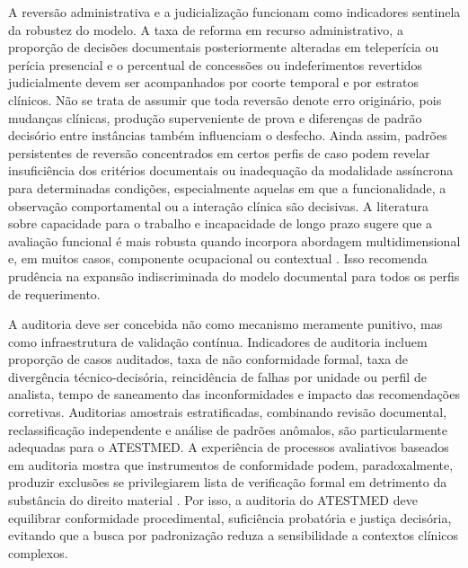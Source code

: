 \documentclass[12pt,a4paper]{article}
\begin{document}
A reversão administrativa e a judicialização funcionam como indicadores sentinela da robustez do modelo. A taxa de reforma em recurso administrativo, a proporção de decisões documentais posteriormente alteradas em teleperícia ou perícia presencial e o percentual de concessões ou indeferimentos revertidos judicialmente devem ser acompanhados por coorte temporal e por estratos clínicos. Não se trata de assumir que toda reversão denote erro originário, pois mudanças clínicas, produção superveniente de prova e diferenças de padrão decisório entre instâncias também influenciam o desfecho. Ainda assim, padrões persistentes de reversão concentrados em certos perfis de caso podem revelar insuficiência dos critérios documentais ou inadequação da modalidade assíncrona para determinadas condições, especialmente aquelas em que a funcionalidade, a observação comportamental ou a interação clínica são decisivas. A literatura sobre capacidade para o trabalho e incapacidade de longo prazo sugere que a avaliação funcional é mais robusta quando incorpora abordagem multidimensional e, em muitos casos, componente ocupacional ou contextual \parencite{gabbay2011niceguidanceonlongtermsicknessandincapacity, przysada2019anassessmentofworkabilityafterthecompletionofre, deveau2011workplaceaccommodationandauditbasedevaluationprocess}. Isso recomenda prudência na expansão indiscriminada do modelo documental para todos os perfis de requerimento.

A auditoria deve ser concebida não como mecanismo meramente punitivo, mas como infraestrutura de validação contínua. Indicadores de auditoria incluem proporção de casos auditados, taxa de não conformidade formal, taxa de divergência técnico-decisória, reincidência de falhas por unidade ou perfil de analista, tempo de saneamento das inconformidades e impacto das recomendações corretivas. Auditorias amostrais estratificadas, combinando revisão documental, reclassificação independente e análise de padrões anômalos, são particularmente adequadas para o ATESTMED. A experiência de processos avaliativos baseados em auditoria mostra que instrumentos de conformidade podem, paradoxalmente, produzir exclusões se privilegiarem lista de verificação formal em detrimento da substância do direito material \parencite{deveau2011workplaceaccommodationandauditbasedevaluationprocess}. Por isso, a auditoria do ATESTMED deve equilibrar conformidade procedimental, suficiência probatória e justiça decisória, evitando que a busca por padronização reduza a sensibilidade a contextos clínicos complexos.
\end{document}
